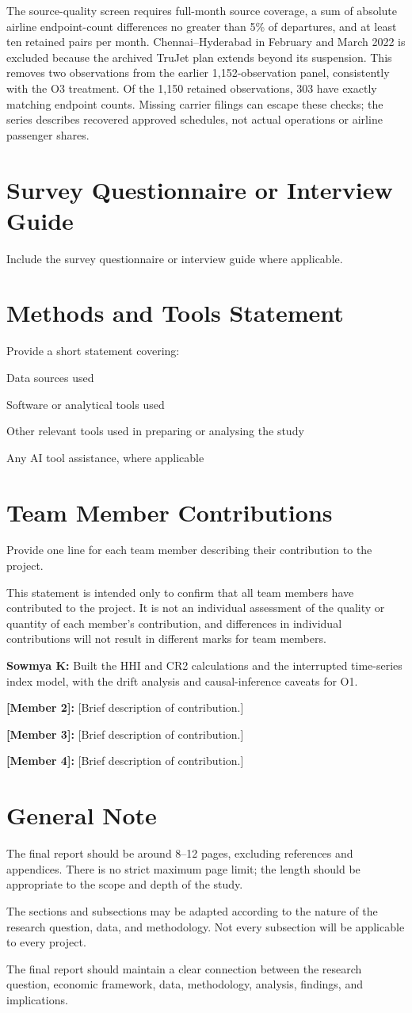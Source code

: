 \documentclass[12pt,a4paper]{article}
\newcommand{\templatebullet}[1]{\par\noindent\textbullet\hspace{5.88pt}#1\par}
\begin{document}
The source-quality screen requires full-month source coverage, a sum of absolute airline endpoint-count differences no greater than 5\% of departures, and at least ten retained pairs per month. Chennai--Hyderabad in February and March 2022 is excluded because the archived TruJet plan extends beyond its suspension. This removes two observations from the earlier 1,152-observation panel, consistently with the O3 treatment. Of the 1,150 retained observations, 303 have exactly matching endpoint counts. Missing carrier filings can escape these checks; the series describes recovered approved schedules, not actual operations or airline passenger shares.


\section{Survey Questionnaire or Interview Guide}
Include the survey questionnaire or interview guide where applicable.

\newpage
\section*{Methods and Tools Statement}
Provide a short statement covering:
\templatebullet{Data sources used}
\templatebullet{Software or analytical tools used}
\templatebullet{Other relevant tools used in preparing or analysing the study}
\templatebullet{Any AI tool assistance, where applicable}

\section*{Team Member Contributions}
Provide one line for each team member describing their contribution to the project.

This statement is intended only to confirm that all team members have contributed to the project. It is not an individual assessment of the quality or quantity of each member's contribution, and differences in individual contributions will not result in different marks for team members.
\templatebullet{\textbf{Sowmya K:} Built the HHI and CR2 calculations and the interrupted time-series index model, with the drift analysis and causal-inference caveats for O1.}
\templatebullet{\textbf{[Member 2]:} [Brief description of contribution.]}
\templatebullet{\textbf{[Member 3]:} [Brief description of contribution.]}
\templatebullet{\textbf{[Member 4]:} [Brief description of contribution.]}

\newpage
\section*{General Note}
The final report should be around 8--12 pages, excluding references and appendices. There is no strict maximum page limit; the length should be appropriate to the scope and depth of the study.

The sections and subsections may be adapted according to the nature of the research question, data, and methodology. Not every subsection will be applicable to every project.

The final report should maintain a clear connection between the research question, economic framework, data, methodology, analysis, findings, and implications.
\end{document}
